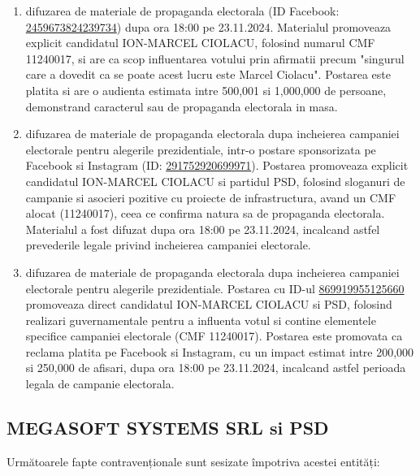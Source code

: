 \documentclass[a4paper,12pt]{article}
\begin{document}
\begin{enumerate}[leftmargin=*, label=\arabic*.)]
    \item difuzarea de materiale de propaganda electorala (ID Facebook: \href{https://www.facebook.com/ads/library/?id=2459673824239734}{2459673824239734}) dupa ora 18:00 pe 23.11.2024. Materialul promoveaza explicit candidatul ION-MARCEL CIOLACU, folosind numarul CMF 11240017, si are ca scop influentarea votului prin afirmatii precum "singurul care a dovedit ca se poate acest lucru este Marcel Ciolacu". Postarea este platita si are o audienta estimata intre 500,001 si 1,000,000 de persoane, demonstrand caracterul sau de propaganda electorala in masa.
    \item difuzarea de materiale de propaganda electorala dupa incheierea campaniei electorale pentru alegerile prezidentiale, intr-o postare sponsorizata pe Facebook si Instagram (ID: \href{https://www.facebook.com/ads/library/?id=291752920699971}{291752920699971}). Postarea promoveaza explicit candidatul ION-MARCEL CIOLACU si partidul PSD, folosind sloganuri de campanie si asocieri pozitive cu proiecte de infrastructura, avand un CMF alocat (11240017), ceea ce confirma natura sa de propaganda electorala. Materialul a fost difuzat dupa ora 18:00 pe 23.11.2024, incalcand astfel prevederile legale privind incheierea campaniei electorale.
    \item difuzarea de materiale de propaganda electorala dupa incheierea campaniei electorale pentru alegerile prezidentiale. Postarea cu ID-ul \href{https://www.facebook.com/ads/library/?id=869919955125660}{869919955125660} promoveaza direct candidatul ION-MARCEL CIOLACU si PSD, folosind realizari guvernamentale pentru a influenta votul si contine elementele specifice campaniei electorale (CMF 11240017). Postarea este promovata ca reclama platita pe Facebook si Instagram, cu un impact estimat intre 200,000 si 250,000 de afisari, dupa ora 18:00 pe 23.11.2024, incalcand astfel perioada legala de campanie electorala.
\end{enumerate}

\vspace{0.5cm}

\subsection{MEGASOFT SYSTEMS SRL si PSD}
Următoarele fapte contravenționale sunt sesizate împotriva acestei entități:
\end{document}

